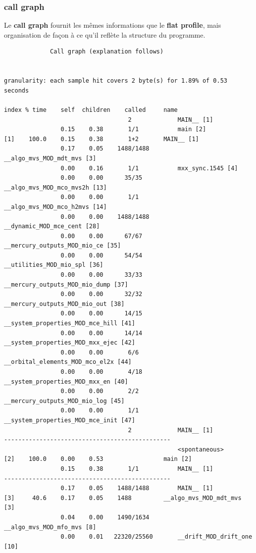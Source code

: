 \documentclass[a4paper,twoside]{article}
\begin{document}
\subsubsection{call graph}
Le \textbf{call graph} fournit les mêmes informations que le \textbf{flat profile}, mais organisation de façon à ce qu'il reflète la structure du programme. 

\begin{verbatim}
		     Call graph (explanation follows)


granularity: each sample hit covers 2 byte(s) for 1.89% of 0.53 seconds

index % time    self  children    called     name
                                   2             MAIN__ [1]
                0.15    0.38       1/1           main [2]
[1]    100.0    0.15    0.38       1+2       MAIN__ [1]
                0.17    0.05    1488/1488        __algo_mvs_MOD_mdt_mvs [3]
                0.00    0.16       1/1           mxx_sync.1545 [4]
                0.00    0.00      35/35          __algo_mvs_MOD_mco_mvs2h [13]
                0.00    0.00       1/1           __algo_mvs_MOD_mco_h2mvs [14]
                0.00    0.00    1488/1488        __dynamic_MOD_mce_cent [28]
                0.00    0.00      67/67          __mercury_outputs_MOD_mio_ce [35]
                0.00    0.00      54/54          __utilities_MOD_mio_spl [36]
                0.00    0.00      33/33          __mercury_outputs_MOD_mio_dump [37]
                0.00    0.00      32/32          __mercury_outputs_MOD_mio_out [38]
                0.00    0.00      14/15          __system_properties_MOD_mce_hill [41]
                0.00    0.00      14/14          __system_properties_MOD_mxx_ejec [42]
                0.00    0.00       6/6           __orbital_elements_MOD_mco_el2x [44]
                0.00    0.00       4/18          __system_properties_MOD_mxx_en [40]
                0.00    0.00       2/2           __mercury_outputs_MOD_mio_log [45]
                0.00    0.00       1/1           __system_properties_MOD_mce_init [47]
                                   2             MAIN__ [1]
-----------------------------------------------
                                                 <spontaneous>
[2]    100.0    0.00    0.53                 main [2]
                0.15    0.38       1/1           MAIN__ [1]
-----------------------------------------------
                0.17    0.05    1488/1488        MAIN__ [1]
[3]     40.6    0.17    0.05    1488         __algo_mvs_MOD_mdt_mvs [3]
                0.04    0.00    1490/1634        __algo_mvs_MOD_mfo_mvs [8]
                0.00    0.01   22320/25560       __drift_MOD_drift_one [10]
\end{verbatim}
\end{document}
